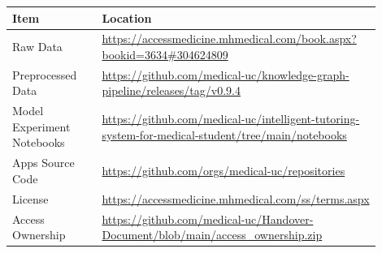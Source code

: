 \documentclass[11pt,a4paper]{article}
\begin{document}
\begin{longtable}{|p{0.35\linewidth}|p{0.55\linewidth}|}
\hline
\textbf{Item} & \textbf{Location} \\
\hline
Raw Data & \url{https://accessmedicine.mhmedical.com/book.aspx?bookid=3634#304624809} \\
\hline
Preprocessed Data & \url{https://github.com/medical-uc/knowledge-graph-pipeline/releases/tag/v0.9.4} \\
\hline
Model Experiment Notebooks & \href{https://github.com/medical-uc/intelligent-tutoring-system-for-medical-student/tree/main/notebooks}{https://github.com/medical-uc/intelligent-tutoring-system-for-medical-student/tree/main/notebooks} \\
\hline
Apps Source Code & \url{https://github.com/orgs/medical-uc/repositories} \\
\hline
License & \url{https://accessmedicine.mhmedical.com/ss/terms.aspx} \\
\hline
Access Ownership & \url{https://github.com/medical-uc/Handover-Document/blob/main/access_ownership.zip} \\
\hline
\end{longtable}

\newpage


\newpage


\newpage


\newpage


\newpage

\end{document}
